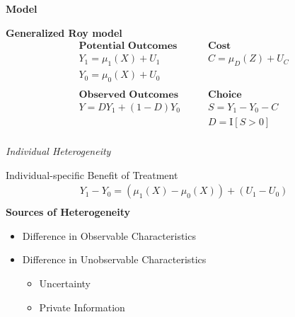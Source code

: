 \begin{frame}\begin{center}
	\LARGE\textbf{Model}
\end{center}\end{frame}
\begin{frame}
	\textbf{Generalized Roy model}
	\begin{align*}
	\textbf{Potential Outcomes} &\qquad \textbf{Cost} \\
	Y_1 = \mu_1(X) + U_1      &\qquad C = \mu_D(Z) + U_C \\
	Y_0 = \mu_0(X) + U_0      &\qquad \\
	& \\
	\textbf{Observed Outcomes} &\qquad \textbf{Choice} \\
	Y = D Y_1 + (1 - D)Y_0 &\qquad S = Y_1 - Y_0 - C \\
	&\qquad D = \mathrm{I}[S > 0] \\
	\end{align*}
\end{frame}
\begin{frame}\begin{center}
		\LARGE\textit{Individual Heterogeneity}
\end{center}\end{frame}
\begin{frame}
	Individual-specific Benefit of Treatment
	\begin{align*}
		Y_1 - Y_0 = (\mu_1(X) - \mu_0(X)) + (U_1 - U_0)\\
	\end{align*}
	\textbf{Sources of Heterogeneity}
	\begin{itemize}\setlength\itemsep{1em}
		\item Difference in Observable Characteristics
		\item Difference in Unobservable Characteristics\medskip
		\begin{itemize}\setlength\itemsep{1em}
			\item  Uncertainty
			\item Private Information
		\end{itemize}
	\end{itemize}
\end{frame}
